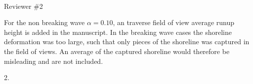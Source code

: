 \\Reviewer \#2


For the non breaking wave $\alpha =0.10$, an traverse field of view average runup height is added in the manuscript. In the breaking wave cases the shoreline deformation was too large, such that only pieces of the shoreline was captured in the field of views. An average of the captured shoreline would therefore be misleading and are not included. 

2.
